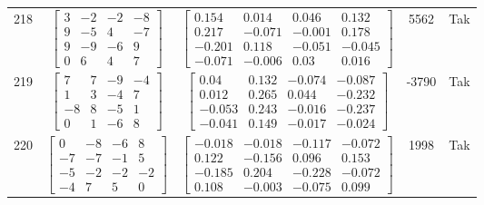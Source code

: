 \documentclass[a4paper,12pt]{article}
\begin{document}
\begin{tabular}{c c c c c}
218
&
$\begin{bmatrix} 3 & -2 & -2 & -8 \\ 9 & -5 & 4 & -7 \\ 9 & -9 & -6 & 9 \\ 0 & 6 & 4 & 7 \end{bmatrix}$
&
$\begin{bmatrix} 0.154 & 0.014 & 0.046 & 0.132 \\ 0.217 & -0.071 & -0.001 & 0.178 \\ -0.201 & 0.118 & -0.051 & -0.045 \\ -0.071 & -0.006 & 0.03 & 0.016 \end{bmatrix}$
&
5562
&
Tak
\\
219
&
$\begin{bmatrix} 7 & 7 & -9 & -4 \\ 1 & 3 & -4 & 7 \\ -8 & 8 & -5 & 1 \\ 0 & 1 & -6 & 8 \end{bmatrix}$
&
$\begin{bmatrix} 0.04 & 0.132 & -0.074 & -0.087 \\ 0.012 & 0.265 & 0.044 & -0.232 \\ -0.053 & 0.243 & -0.016 & -0.237 \\ -0.041 & 0.149 & -0.017 & -0.024 \end{bmatrix}$
&
-3790
&
Tak
\\
220
&
$\begin{bmatrix} 0 & -8 & -6 & 8 \\ -7 & -7 & -1 & 5 \\ -5 & -2 & -2 & -2 \\ -4 & 7 & 5 & 0 \end{bmatrix}$
&
$\begin{bmatrix} -0.018 & -0.018 & -0.117 & -0.072 \\ 0.122 & -0.156 & 0.096 & 0.153 \\ -0.185 & 0.204 & -0.228 & -0.072 \\ 0.108 & -0.003 & -0.075 & 0.099 \end{bmatrix}$
&
1998
&
Tak
\\
\end{tabular} \egroup \newpage
\end{document}
